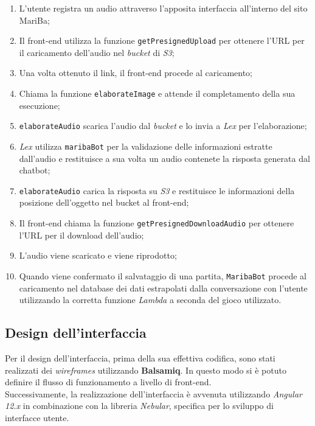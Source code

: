 	\begin{enumerate}
		\item L'utente registra un audio attraverso l'apposita interfaccia all'interno del sito MariBa;
		\item Il front-end utilizza la funzione \texttt{getPresignedUpload} per ottenere l'URL per il caricamento dell'audio nel \emph{bucket} di \emph{S3};
		\item Una volta ottenuto il link, il front-end procede al caricamento;
		\item Chiama la funzione \texttt{elaborateImage} e attende il completamento della sua esecuzione;
		\item \texttt{elaborateAudio} scarica l'audio dal \emph{bucket} e lo invia a \emph{Lex} per l'elaborazione;
		\item \emph{Lex} utilizza \texttt{maribaBot} per la validazione delle informazioni estratte dall'audio e restituisce a sua volta un audio contenete la risposta generata dal \gls{chatbot};
		\item \texttt{elaborateAudio} carica la risposta su \emph{S3} e restituisce le informazioni della posizione dell'oggetto nel bucket al front-end;
		\item Il front-end chiama la funzione \texttt{getPresignedDownloadAudio} per ottenere l'URL per il download dell'audio;
		\item L'audio viene scaricato e viene riprodotto;
		\item Quando viene confermato il salvataggio di una partita, \texttt{MaribaBot} procede al caricamento nel database dei dati estrapolati dalla conversazione con l'utente utilizzando la corretta funzione \emph{Lambda} a seconda del gioco utilizzato.
	\end{enumerate}
	
	\subsection{Design dell'interfaccia}
	Per il design dell'interfaccia, prima della sua effettiva codifica, sono stati realizzati dei \emph{wireframes} utilizzando \textbf{Balsamiq}. In questo modo si è potuto definire il flusso di funzionamento a livello di front-end. \\ 
	
	\noindent Successivamente, la realizzazione dell'interfaccia è avvenuta utilizzando \emph{Angular 12.x} in combinazione con la libreria 
	\emph{Nebular}, specifica per lo sviluppo di interfacce utente. \\
	
